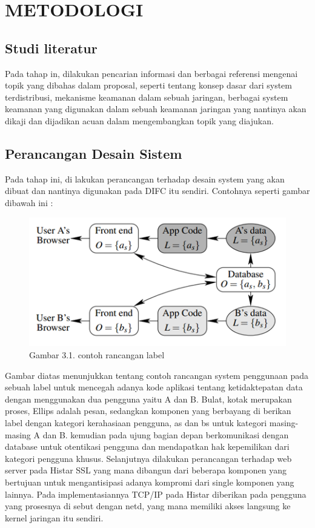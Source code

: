 \documentclass{jtetiproposalskripsi}
\begin{document}
\chapter{METODOLOGI}

\section{Studi literatur}


Pada tahap in, dilakukan pencarian informasi dan berbagai referensi mengenai topik yang dibahas dalam proposal, seperti tentang konsep dasar dari system terdistribusi, mekanisme keamanan dalam sebuah jaringan, berbagai system keamanan yang digunakan dalam sebuah keamanan jaringan yang nantinya akan dikaji dan dijadikan acuan dalam mengembangkan topik yang diajukan.
\section{Perancangan Desain Sistem}  
Pada tahap ini, di lakukan perancangan terhadap desain system yang akan dibuat dan nantinya digunakan pada DIFC itu sendiri. Contohnya seperti gambar dibawah ini :

\begin{figure}[ht!]
  \centering
    \includegraphics{gambar/metodologi}
    \caption{Gambar 3.1. contoh rancangan label}
    \label{star}
\end{figure}

Gambar diatas menunjukkan tentang contoh rancangan system penggunaan pada sebuah label untuk mencegah adanya kode aplikasi tentang ketidaktepatan data dengan menggunakan dua pengguna yaitu A dan B. Bulat, kotak merupakan proses, Ellips adalah pesan, sedangkan komponen yang berbayang di berikan label dengan kategori kerahasiaan pengguna, as dan bs untuk kategori masing-masing  A dan B. kemudian pada ujung bagian depan berkomunikasi dengan database untuk otentikasi pengguna dan mendapatkan hak kepemilikan dari kategori pengguna khusus.
Selanjutnya dilakukan perancangan terhadap web server pada Histar  SSL yang mana dibangun dari beberapa komponen yang bertujuan untuk mengantisipasi adanya kompromi dari single komponen yang lainnya. Pada implementasiannya TCP/IP  pada Histar diberikan pada pengguna yang prosesnya di sebut dengan netd, yang mana memiliki akses langsung ke kernel jaringan itu sendiri.
\end{document}
